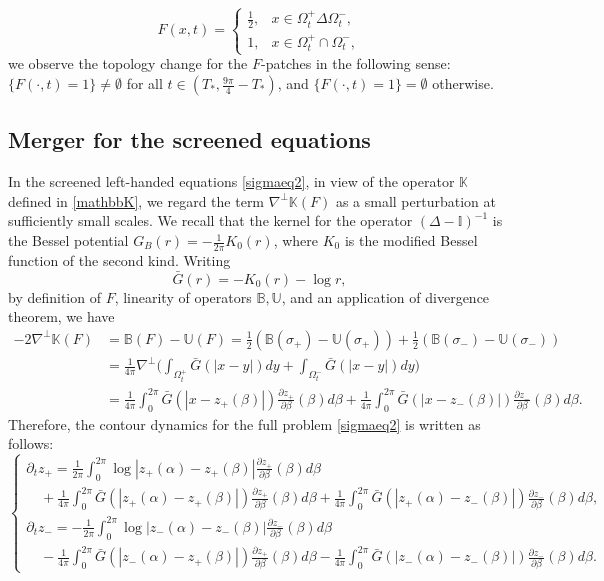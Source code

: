 \documentclass[11pt,reqno]{amsproc}
\newcommand{\pa}{\partial}
\newcommand{\B}{\mathbb{B}}
\newcommand{\U}{\mathbb{U}}
\begin{document}
\begin{equation}\label{defn:Fpatch}
F(x,t) = \begin{cases}
    \frac12,& x \in {\Omega_t^+} \Delta {\Omega_t^-},\\
    1,& x \in {\Omega_t^+} \cap {\Omega_t^-},
\end{cases}
\end{equation}
we observe  the topology change for the $F$-patches in the following sense: $\{F(\cdot,t) = 1\} \neq \emptyset$ for all $t \in (T_*, \frac{9\pi}{4} - T_*)$, and $\{F(\cdot,t) = 1\}= \emptyset$ otherwise.
\subsection{Merger for the screened equations}
In the screened left-handed equations \eqref{sigmaeq2}, in view of the operator $\mathbb{K}$ defined in \eqref{mathbbK}, we regard the term $\nabla^\perp \mathbb K(F)$ as a small perturbation at sufficiently small scales. We recall that the kernel for the operator $(\Delta - \mathbb{I})^{-1}$ is the Bessel potential $G_B(r) = -\frac{1}{2\pi}K_0(r)$, where $K_0$ is the modified Bessel function of the second kind. Writing
$$
\bar G(r) = -K_0(r) -  \log r,
$$
by definition of $F$, linearity of operators $\B, \U$, and an application of divergence theorem, we have
\begin{align*}
-2\nabla^\perp \mathbb K(F) &=\B(F) - \U(F) = \frac{1}{2}(\B(\sigma_+) - \U(\sigma_+)) + \frac12 \left(\B(\sigma_-) - \U(\sigma_-)\right)\\
&= \frac{1}{4\pi}\nabla^\perp\bigg(\int_{\Omega^+_t} \bar G(|x-y|) dy+ \int_{\Omega^-_t} \bar G(|x-y|) dy\bigg)\\
&= \frac{1}{4\pi} \int_0^{2\pi} \bar G(|x - z_+(\beta)|)\frac{\pa z_+}{\pa \beta}(\beta) d\beta + \frac{1}{4\pi} \int_0^{2\pi} \bar G(|x - z_-(\beta)|)\frac{\pa z_-}{\pa \beta}(\beta) d\beta.
\end{align*}
Therefore, the contour dynamics for the full problem \eqref{sigmaeq2} is written as follows:
\begin{equation}
\label{contour}
\begin{cases}
    \pa_t z_+ = \frac{1}{2\pi}\int_0^{2\pi} \log|z_+(\alpha) - z_+(\beta)| \frac{\pa z_+}{\pa \beta}(\beta) d\beta\\
    \quad+ \frac{1}{4\pi} \int_0^{2\pi} \bar G(|z_+(\alpha) - z_+(\beta)|)\frac{\pa z_+}{\pa \beta}(\beta) d\beta+ \frac{1}{4\pi} \int_0^{2\pi} \bar G(|z_+(\alpha) - z_-(\beta)|)\frac{\pa z_-}{\pa \beta}(\beta) d\beta,\\
    \pa_t z_- = -\frac{1}{2\pi}\int_0^{2\pi} \log|z_-(\alpha) - z_-(\beta)| \frac{\pa z_-}{\pa \beta}(\beta) d\beta\\
    \quad- \frac{1}{4\pi} \int_0^{2\pi} \bar G(|z_-(\alpha) - z_+(\beta)|)\frac{\pa z_+}{\pa \beta}(\beta) d\beta- \frac{1}{4\pi} \int_0^{2\pi} \bar G(|z_-(\alpha) - z_-(\beta)|)\frac{\pa z_-}{\pa \beta}(\beta) d\beta.
\end{cases}
\end{equation}
\end{document}
